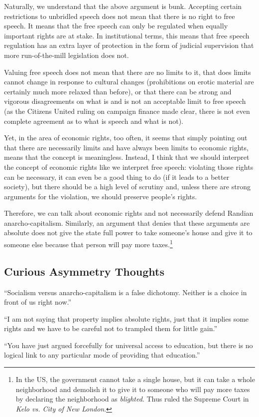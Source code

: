 Naturally, we understand that the above argument is bunk. Accepting certain
restrictions to unbridled speech does not mean that there is no right to free
speech. It means that the free speech can only be regulated when equally
important rights are at stake. In institutional terms, this means that free
speech regulation has an extra layer of protection in the form of judicial
supervision that more run-of-the-mill legislation does not.

Valuing free speech does not mean that there are no limits to it, that does
limits cannot change in response to cultural changes (prohibitions on erotic
material are certainly much more relaxed than before), or that there can be
strong and vigorous disagreements on what is and is not an acceptable limit to
free speech (as the Citizens United ruling on campaign finance made clear,
there is not even complete agreement as to what is speech and what is not).

Yet, in the area of economic rights, too often, it seems that simply pointing
out that there are necessarily limits and have always been limits to economic
rights, means that the concept is meaningless. Instead, I think that we should
interpret the concept of economic rights like we interpret free speech:
violating those rights can be necessary, it can even be a good thing to do (if
it leads to a better society), but there should be a high level of scrutiny
and, unless there are strong arguments for the violation, we should preserve
people's rights.

Therefore, we can talk about economic rights and not necessarily defend Randian
anarcho-capitalism. Similarly, an argument that denies that these arguments are
absolute does not give the state full power to take someone's house and give it
to someone else because that person will pay more taxes.\footnote{In the US,
the government cannot take a single house, but it can take a whole neighborhood
and demolish it to give it to someone who will pay more taxes by declaring the
neighborhood as \emph{blighted}. Thus ruled the Supreme Court in \emph{Kelo vs.
City of New London}.}

\subsection{Curious Asymmetry Thoughts}

``Socialism versus anarcho-capitalism is a false dichotomy. Neither is a choice
in front of us right now.''

``I am not saying that property implies absolute rights, just that it implies
some rights and we have to be careful not to trampled them for little gain.''

``You have just argued forcefully for universal access to education, but there
is no logical link to any particular mode of providing that education.''

